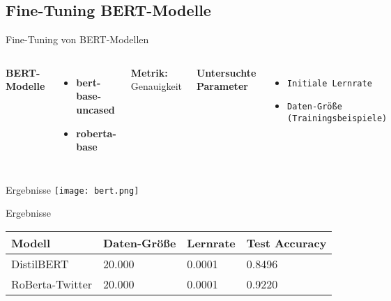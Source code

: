 \documentclass[aspectratio=169]{beamer} %
\begin{document}
\subsection{Fine-Tuning BERT-Modelle}
\begin{frame}{Fine-Tuning von BERT-Modellen}
  \fontsize{10pt}{12pt}\selectfont
  \vspace{0.3cm}

  \begin{columns}
      \textbf{BERT-Modelle}
      \vspace{0.3cm}
      \begin{itemize}
          \item \textbf{bert-base-uncased}
          \item \textbf{roberta-base}
      \end{itemize}
      \vspace{0.5cm}
      \textbf{Metrik:} Genauigkeit
      \vspace{-1cm}

      \textbf{Untersuchte Parameter}
      \vspace{0.3cm}
      \begin{itemize}
          \item \texttt{Initiale Lernrate}
          \item \texttt{Daten-Größe (Trainingsbeispiele)}
      \end{itemize}
  \end{columns}
\end{frame}

\begin{frame}{Ergebnisse}
    \centering
     \texttt{[image: bert.png]}
\end{frame}






\begin{frame}{Ergebnisse}
    \centering
    \scriptsize
    \begin{tabular}{|l|l|l|l|}
        \hline
        \textbf{Modell} & \textbf{Daten-Größe} & \textbf{Lernrate} & \textbf{Test Accuracy} \\
        \hline
        DistilBERT & 20.000 & 0.0001 & 0.8496 \\
        RoBerta-Twitter & 20.000 & 0.0001 & 0.9220 \\
        \hline
    \end{tabular}
\end{frame}
\end{document}

